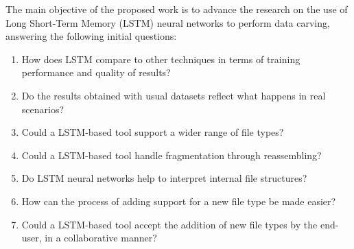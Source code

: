 The main objective of the proposed work is to advance the research on the use of Long Short-Term Memory (LSTM) neural networks to perform data carving, answering the following initial questions:

\begin{enumerate}[itemindent=\parindent,label=\textbf{Q\arabic*.}]
  \item How does LSTM compare to other techniques in terms of training performance and quality of results?
  \item Do the results obtained with usual datasets reflect what happens in real scenarios?
  \item Could a LSTM-based tool support a wider range of file types?
   \item Could a LSTM-based tool handle fragmentation through reassembling?
   \item Do LSTM neural networks help to interpret internal file structures?
  \item How can the process of adding support for a new file type be made easier?
  \item Could a LSTM-based tool accept the addition of new file types by the end-user, in a collaborative manner? 
  \end{enumerate}


